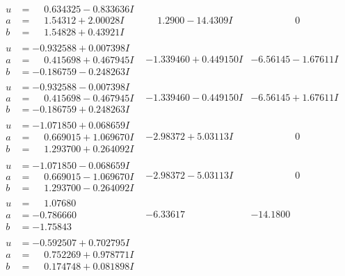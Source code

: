 \documentclass[1p]{elsarticle_modified}
\theoremstyle{definition}
\begin{document}
$$\begin{array}{c|c|c}
\begin{aligned}
u &= \phantom{-}0.634325 - 0.833636 I \\
a &= \phantom{-}1.54312 + 2.00028 I \\
b &= \phantom{-}1.54828 + 0.43921 I\end{aligned}
 & \phantom{-}1.2900 - 14.4309 I & \phantom{-0.000000 } 0 \\ \hline\begin{aligned}
u &= -0.932588 + 0.007398 I \\
a &= \phantom{-}0.415698 + 0.467945 I \\
b &= -0.186759 - 0.248263 I\end{aligned}
 & -1.339460 + 0.449150 I & -6.56145 - 1.67611 I \\ \hline\begin{aligned}
u &= -0.932588 - 0.007398 I \\
a &= \phantom{-}0.415698 - 0.467945 I \\
b &= -0.186759 + 0.248263 I\end{aligned}
 & -1.339460 - 0.449150 I & -6.56145 + 1.67611 I \\ \hline\begin{aligned}
u &= -1.071850 + 0.068659 I \\
a &= \phantom{-}0.669015 + 1.069670 I \\
b &= \phantom{-}1.293700 + 0.264092 I\end{aligned}
 & -2.98372 + 5.03113 I & \phantom{-0.000000 } 0 \\ \hline\begin{aligned}
u &= -1.071850 - 0.068659 I \\
a &= \phantom{-}0.669015 - 1.069670 I \\
b &= \phantom{-}1.293700 - 0.264092 I\end{aligned}
 & -2.98372 - 5.03113 I & \phantom{-0.000000 } 0 \\ \hline\begin{aligned}
u &= \phantom{-}1.07680\phantom{ +0.000000I} \\
a &= -0.786660\phantom{ +0.000000I} \\
b &= -1.75843\phantom{ +0.000000I}\end{aligned}
 & -6.33617\phantom{ +0.000000I} & -14.1800\phantom{ +0.000000I} \\ \hline\begin{aligned}
u &= -0.592507 + 0.702795 I \\
a &= \phantom{-}0.752269 + 0.978771 I \\
b &= \phantom{-}0.174748 + 0.081898 I\end{aligned}

\end{array}$$
\end{document}
